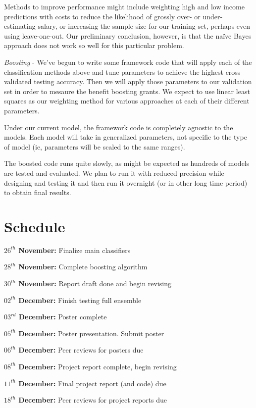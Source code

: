 \documentclass{pset}
\begin{document}
Methods to improve performance might include weighting high and low income
predictions with costs to reduce the likelihood of grossly over- or under-
estimating salary, or increasing the sample size for our training set, perhaps
even using leave-one-out. Our preliminary conclusion, however, is that the naïve
Bayes approach does not work so well for this particular problem.

{\it Boosting} - We've begun to write some framework code that will apply each
of the classification methods above and tune parameters to achieve the highest
cross validated testing accuracy.  Then we will apply those parameters to our
validation set in order to mesaure the benefit boosting grants. We expect to use
linear least squares as our weighting method for various approaches at each of
their different parameters.

Under our current model, the framework code is completely agnostic to the
models.  Each model will take in generalized parameters, not specific to the
type of model (ie, parameters will be scaled to the same ranges).

The boosted code runs quite slowly, as might be expected as hundreds of models
are tested and evaluated.  We plan to run it with reduced precision while
designing and testing it and then run it overnight (or in other long time
period) to obtain final results.

\section*{Schedule}

{\bf$26^{th}$ November:} Finalize main classifiers

{\bf$28^{th}$ November:} Complete boosting algorithm

{\bf$30^{th}$ November:} Report draft done and begin revising

{\bf$02^{th}$ December:} Finish testing full ensemble

{\bf$03^{rd}$ December:} Poster complete

{\bf$05^{th}$ December:} Poster presentation.  Submit poster

{\bf$06^{th}$ December:} Peer reviews for posters due

{\bf$08^{th}$ December:} Project report complete, begin revising

{\bf$11^{th}$ December:} Final project report (and code) due

{\bf$18^{th}$ December:} Peer reviews for project reports due
\end{document}
